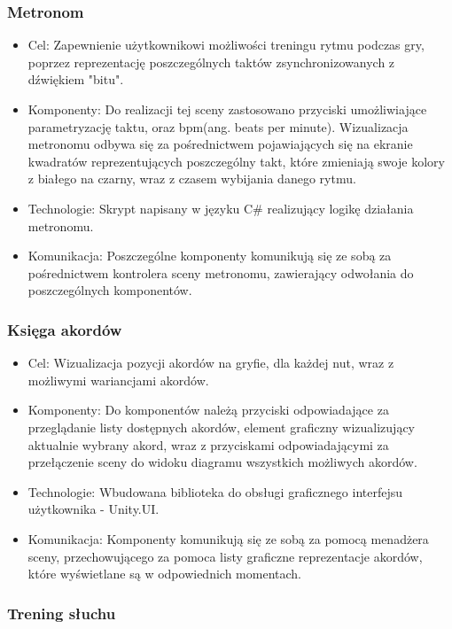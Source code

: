 \subsubsection{Metronom}

\begin{itemize}
\item Cel: Zapewnienie użytkownikowi możliwości treningu rytmu podczas gry, poprzez reprezentację poszczególnych taktów zsynchronizowanych z dźwiękiem "bitu".
\item Komponenty: Do realizacji tej sceny zastosowano przyciski umożliwiające parametryzację taktu, oraz bpm(ang. beats per minute). Wizualizacja metronomu odbywa się za pośrednictwem pojawiających się na ekranie kwadratów reprezentujących poszczególny takt, które zmieniają swoje kolory z białego na czarny, wraz z czasem wybijania danego rytmu.
\item Technologie: Skrypt napisany w języku C\# realizujący logikę działania metronomu.
\item Komunikacja: Poszczególne komponenty komunikują się ze sobą za pośrednictwem kontrolera sceny metronomu, zawierający odwołania do poszczególnych komponentów.
\end{itemize}

\subsubsection{Księga akordów}

\begin{itemize}
\item Cel: Wizualizacja pozycji akordów na gryfie, dla każdej nut, wraz z możliwymi wariancjami akordów.
\item Komponenty: Do komponentów należą przyciski odpowiadające za przeglądanie listy dostępnych akordów, element graficzny wizualizujący aktualnie wybrany akord, wraz z przyciskami odpowiadającymi za przełączenie sceny do widoku diagramu wszystkich możliwych akordów.
\item Technologie: Wbudowana biblioteka do obsługi graficznego interfejsu użytkownika - Unity.UI.
\item Komunikacja: Komponenty komunikują się ze sobą za pomocą menadżera sceny, przechowującego za pomoca listy graficzne reprezentacje akordów, które wyświetlane są w odpowiednich momentach. 
\end{itemize}

\subsubsection{Trening słuchu}

